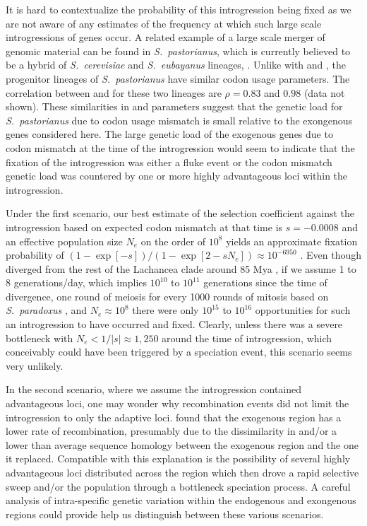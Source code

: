 It is hard to contextualize the probability of this introgression being fixed as we are not aware of any estimates of the frequency at which such large scale introgressions of genes occur.
A related example of a large scale merger of genomic material can be found in \emph{S.~pastorianus}, which is currently believed to be a hybrid of \emph{S.~cerevisiae} and \emph{S.~eubayanus} lineages, \citep{baker2015}.
Unlike with \kluyveri and \gossypii, the  progenitor lineages of \emph{S.~pastorianus} have similar codon usage parameters.
The correlation between \DM and \DE for these two lineages are  $\rho = 0.83$ and  $0.98$ (data not shown).
These similarities in \DM and \DE parameters suggest that the genetic load for \emph{S.~pastorianus} due to codon usage mismatch is small relative to the exongenous genes considered here. 
The large genetic load of the exogenous genes due to codon mismatch at the time of the introgression would seem to indicate that the fixation of the introgression was either a fluke event or the codon mismatch genetic load was countered by one or more highly advantageous loci within the introgression.

Under the  first scenario, our best estimate of the selection coefficient against the introgression based on expected codon mismatch at that time is $s = -0.0008$ and an effective population size $N_e$ on the order of $10^8$ \citep{wagner2005} yields an approximate fixation probability of $(1-\exp[- s])/(1-\exp[2 - sN_e]) \approx 10^{-6950}$ \citep{SellaAndHirsh2005}.
Even though \kluyveri diverged from the rest of the Lachancea clade around 85 Mya \citep{kensche2008, MHM2015}, if we assume 1 to 8 generations/day, which implies $10^{10}$ to $10^{11}$ generations since the time of divergence, one round of meiosis for every 1000 rounds of mitosis based on \emph{S.~paradoxus} \citep{tsai2008}, and $N_e \approx 10^8$ there were only $10^{15}$ to $10^{16}$ opportunities for such an introgression to have occurred and fixed.
Clearly, unless there was a severe bottleneck with $N_e < 1/|s| \approx 1,250$ around the time of introgression, which conceivably could have been triggered by a speciation event, this scenario seems very unlikely.

In the second scenario, where we assume the introgression contained advantageous loci, one may wonder why recombination events did not limit the introgression to only the adaptive loci.
\citet{payen2009} found that the exogenous region has a lower rate of recombination, presumably due to the dissimilarity in \GC and/or a lower than average sequence homology between the exogenous region and the one it replaced.
Compatible with this explanation is the possibility of several highly advantageous loci distributed across the region which then drove a rapid selective sweep and/or the population through a bottleneck speciation process.
A careful analysis of intra-specific genetic variation within the endogenous and exongenous regions could provide help us distinguish between these various scenarios.

